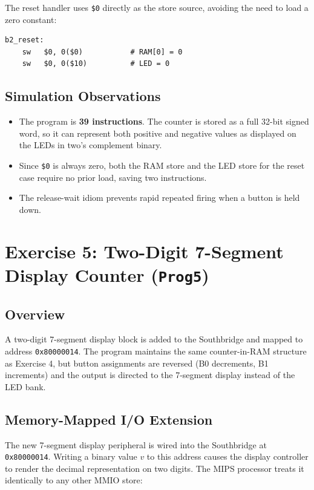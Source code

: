 \documentclass[12pt,a4paper]{article}
\begin{document}
The reset handler uses \texttt{\$0} directly as the store source, avoiding the need to load a zero constant:

\begin{lstlisting}[style=mips, caption={Reset Handler (B2)}]
b2_reset:
    sw   $0, 0($0)           # RAM[0] = 0
    sw   $0, 0($10)          # LED = 0
\end{lstlisting}

\subsection{Simulation Observations}
\begin{itemize}
    \item The program is \textbf{39 instructions}. The counter is stored as a full 32-bit signed word, so it can represent both positive and negative values as displayed on the LEDs in two's complement binary.
    \item Since \texttt{\$0} is always zero, both the RAM store and the LED store for the reset case require no prior load, saving two instructions.
    \item The release-wait idiom prevents rapid repeated firing when a button is held down.
\end{itemize}

\newpage
\section{Exercise 5: Two-Digit 7-Segment Display Counter (\texttt{Prog5})}

\subsection{Overview}
A two-digit 7-segment display block is added to the Southbridge and mapped to address \texttt{0x80000014}. The program maintains the same counter-in-RAM structure as Exercise 4, but button assignments are reversed (B0 decrements, B1 increments) and the output is directed to the 7-segment display instead of the LED bank.

\subsection{Memory-Mapped I/O Extension}
The new 7-segment display peripheral is wired into the Southbridge at \texttt{0x80000014}. Writing a binary value $v$ to this address causes the display controller to render the decimal representation on two digits. The MIPS processor treats it identically to any other MMIO store:
\end{document}
